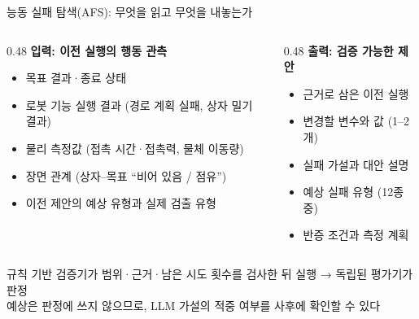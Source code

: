 \documentclass[aspectratio=169,11pt]{beamer}
\begin{document}
\begin{frame}{능동 실패 탐색(AFS): 무엇을 읽고 무엇을 내놓는가}
\vspace{3mm}
\begin{columns}[T]
\begin{column}{0.48\textwidth}
\textbf{입력: 이전 실행의 행동 관측}
\begin{itemize}
\item 목표 결과·종료 상태
\item 로봇 기능 실행 결과 (경로 계획 실패, 상자 밀기 결과)
\item 물리 측정값 (접촉 시간·접촉력, 물체 이동량)
\item 장면 관계 (상자–목표 ``비어 있음 / 점유'')
\item 이전 제안의 예상 유형과 실제 검출 유형
\end{itemize}
\end{column}
\begin{column}{0.48\textwidth}
\textbf{출력: 검증 가능한 제안}
\begin{itemize}
\item 근거로 삼은 이전 실행
\item 변경할 변수와 값 (1--2개)
\item 실패 가설과 대안 설명
\item 예상 실패 유형 (12종 중)
\item 반증 조건과 측정 계획
\end{itemize}
\end{column}
\end{columns}
\vspace{6mm}
\begin{center}
\colorbox{afs!10}{\parbox{0.92\textwidth}{\centering
규칙 기반 검증기가 범위·근거·남은 시도 횟수를 검사한 뒤 실행 \;→\; 독립된 평가기가 판정\\
{\small\color{muted}예상은 판정에 쓰지 않으므로, LLM 가설의 적중 여부를 사후에 확인할 수 있다}}}
\end{center}
\end{frame}
\end{document}
